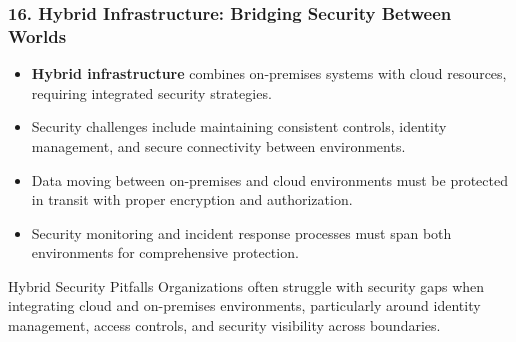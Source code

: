 \documentclass{beamer}
\begin{document}
	\begin{frame}
		\frametitle{16. Hybrid Infrastructure: Bridging Security Between Worlds}
		\begin{itemize}
			\item \textbf{Hybrid infrastructure} combines on-premises systems with cloud resources, requiring integrated security strategies.
			\item Security challenges include maintaining consistent controls, identity management, and secure connectivity between environments.
			\item Data moving between on-premises and cloud environments must be protected in transit with proper encryption and authorization.
			\item Security monitoring and incident response processes must span both environments for comprehensive protection.
		\end{itemize}
		
		\begin{alertblock}{Hybrid Security Pitfalls}
			Organizations often struggle with security gaps when integrating cloud and on-premises environments, particularly around identity management, access controls, and security visibility across boundaries.
		\end{alertblock}
	\end{frame}
	
\end{document}
